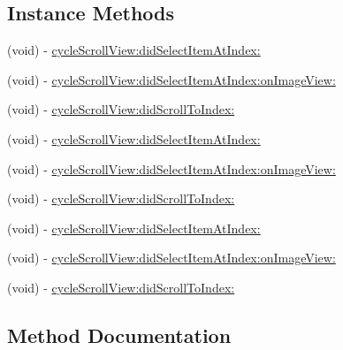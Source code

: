 \subsection*{Instance Methods}
\begin{DoxyCompactItemize}
\item 
(void) -\/ \mbox{\hyperlink{protocol_s_d_cycle_scroll_view_delegate_01-p_a11e44232d7c53fa6ae8dcbf132ac49be}{cycle\+Scroll\+View\+:did\+Select\+Item\+At\+Index\+:}}
\item 
(void) -\/ \mbox{\hyperlink{protocol_s_d_cycle_scroll_view_delegate_01-p_ad67d8b19b0b2353ba188db5f969e4c3e}{cycle\+Scroll\+View\+:did\+Select\+Item\+At\+Index\+:on\+Image\+View\+:}}
\item 
(void) -\/ \mbox{\hyperlink{protocol_s_d_cycle_scroll_view_delegate_01-p_aff14bc01969477174234c488769d989f}{cycle\+Scroll\+View\+:did\+Scroll\+To\+Index\+:}}
\item 
(void) -\/ \mbox{\hyperlink{protocol_s_d_cycle_scroll_view_delegate_01-p_a11e44232d7c53fa6ae8dcbf132ac49be}{cycle\+Scroll\+View\+:did\+Select\+Item\+At\+Index\+:}}
\item 
(void) -\/ \mbox{\hyperlink{protocol_s_d_cycle_scroll_view_delegate_01-p_ad67d8b19b0b2353ba188db5f969e4c3e}{cycle\+Scroll\+View\+:did\+Select\+Item\+At\+Index\+:on\+Image\+View\+:}}
\item 
(void) -\/ \mbox{\hyperlink{protocol_s_d_cycle_scroll_view_delegate_01-p_aff14bc01969477174234c488769d989f}{cycle\+Scroll\+View\+:did\+Scroll\+To\+Index\+:}}
\item 
(void) -\/ \mbox{\hyperlink{protocol_s_d_cycle_scroll_view_delegate_01-p_a11e44232d7c53fa6ae8dcbf132ac49be}{cycle\+Scroll\+View\+:did\+Select\+Item\+At\+Index\+:}}
\item 
(void) -\/ \mbox{\hyperlink{protocol_s_d_cycle_scroll_view_delegate_01-p_ad67d8b19b0b2353ba188db5f969e4c3e}{cycle\+Scroll\+View\+:did\+Select\+Item\+At\+Index\+:on\+Image\+View\+:}}
\item 
(void) -\/ \mbox{\hyperlink{protocol_s_d_cycle_scroll_view_delegate_01-p_aff14bc01969477174234c488769d989f}{cycle\+Scroll\+View\+:did\+Scroll\+To\+Index\+:}}
\end{DoxyCompactItemize}


\subsection{Method Documentation}
\mbox{\label{protocol_s_d_cycle_scroll_view_delegate_01-p_aff14bc01969477174234c488769d989f}} 

